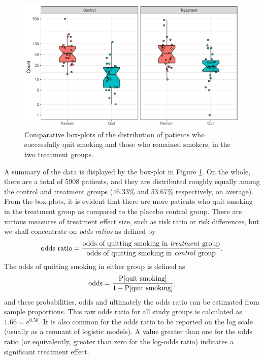 \documentclass[a4paper,showframe,11pt]{report}\usepackage[]{graphicx}\usepackage[]{color}
\makeatletter
\def\maxwidth{ %
  \ifdim\Gin@nat@width>\linewidth
    \linewidth
  \else
    \Gin@nat@width
  \fi
}
\newenvironment{knitrout}{}{} %
\makeatother
\begin{document}
\begin{knitrout}
\color{fgcolor}\begin{figure}[htb]

{\centering \includegraphics[width=\maxwidth]{figure/05-plot_data_smoke-1} 

}

\caption[Comparative box-plots of the distribution of patients who successfully quit smoking and those who remained smokers, in the two treatment groups]{Comparative box-plots of the distribution of patients who successfully quit smoking and those who remained smokers, in the two treatment groups.}\label{fig:plot.data.smoke}
\end{figure}


\end{knitrout}
A summary of the data is displayed by the box-plot in Figure \ref{fig:plot.data.smoke}.
On the whole, there are a total of 5908 patients, and they are distributed roughly equally among the control and treatment groups (46.33\% and 53.67\% respectively, on average).
From the box-plots, it is evident that there are more patients who quit smoking in the treatment group as compared to the placebo control group.
There are various measures of treatment effect size, such as risk ratio or risk differences, but we shall concentrate on \emph{odds ratios} as defined by
\[
  \text{odds ratio} = \frac{\text{odds of quitting smoking in \emph{treatment} group}}
  {\text{odds of quitting smoking in \emph{control} group}}.
\]
The odds of quitting smoking in either group is defined as
\[
  \text{odds} = \frac{\operatorname{P}[\text{quit smoking}]}{1 - \operatorname{P}[\text{quit smoking}]},
\]
and these probabilities, odds and ultimately the odds ratio can be estimated from sample proportions.
This raw odds ratio for all study groups is calculated as $1.66 = e^{0.50}$.
It is also common for the odds ratio to be reported on the log scale (usually as a remnant of logistic models).
A value greater than one for the odds ratio (or equivalently, greater than zero for the log-odds ratio) indicates a significant treatment effect.
\end{document}
